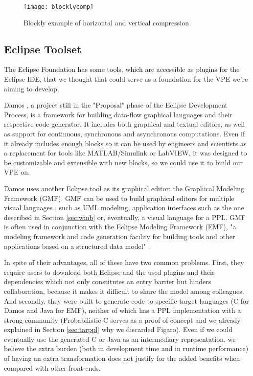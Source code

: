 \begin{figure}[t]
  \begin{center}
    \leavevmode
    \texttt{[image: blocklycomp]}
    \caption{Blockly example of horizontal and vertical compression \cite{blockly}}
    \label{fig:blocklycomp}
  \end{center}
\end{figure}

\subsection{Eclipse Toolset}

The Eclipse Foundation has some tools, which are accessible as plugins for the
Eclipse IDE, that we thought that could serve as a foundation for the VPE we're
aiming to develop.

Damos \cite{damos}, a project still in the "Proposal" phase of the Eclipse
Development Process, is a framework for building data-flow graphical languages
and their respective code generator. It includes both graphical and textual editors,
as well as support for continuous, synchronous and asynchronous computations.
Even if it already includes enough blocks so it can be used by engineers and scientists
as a replacement for tools like MATLAB/Simulink or LabVIEW, it was designed to
be customizable and extensible with new blocks, so we could use it to build our VPE on.

Damos uses another Eclipse tool as its graphical editor: the Graphical Modeling
Framework (GMF). GMF can be used to build graphical editors for multiple visual
languages \cite{gmf}, such as UML modeling, application interfaces such as the
one described in Section \ref{sec:winb} or, eventually, a visual language for a
PPL. GMF is often used in conjunction with the Eclipse Modeling Framework (EMF),
"a modeling framework and code generation facility for building tools and other
applications based on a structured data model" \cite{emf}.

In spite of their advantages, all of these have two common problems. First, they require
users to download both Eclipse and the used plugins and their dependencies
which not only constitutes an entry barrier but hinders collaboration, because
it makes it difficult to share the model among colleagues. And secondly, they
were built to generate code to specific target languages (C for Damos and Java
for EMF), neither of which has a PPL implementation with a strong community
(Probabilistic-C \cite{Paige2014} serves as a proof of concept and we already explained
in Section \ref{sec:tarppl} why we discarded Figaro). Even if we could eventually
use the generated C or Java as an intermediary representation, we believe the
extra burden (both in development time and in runtime performance) of having an
extra transformation does not justify for the added benefits when compared with
other front-ends.

